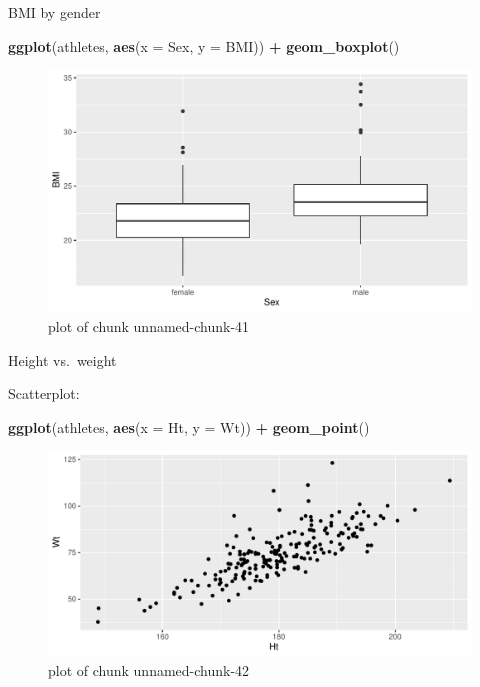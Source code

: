 \documentclass[
  ignorenonframetext,
]{beamer}
\newenvironment{Shaded}{\begin{snugshade}}{\end{snugshade}}
\newcommand{\DataTypeTok}[1]{\textcolor[rgb]{0.13,0.29,0.53}{#1}}
\newcommand{\KeywordTok}[1]{\textcolor[rgb]{0.13,0.29,0.53}{\textbf{#1}}}
\newcommand{\NormalTok}[1]{#1}
\newcommand{\OperatorTok}[1]{\textcolor[rgb]{0.81,0.36,0.00}{\textbf{#1}}}
\newcommand{\StringTok}[1]{\textcolor[rgb]{0.31,0.60,0.02}{#1}}
\begin{document}
\begin{frame}[fragile]{BMI by gender}
\protect\hypertarget{bmi-by-gender}{}

\begin{Shaded}
\begin{Highlighting}[]
\KeywordTok{ggplot}\NormalTok{(athletes, }\KeywordTok{aes}\NormalTok{(}\DataTypeTok{x =}\NormalTok{ Sex, }\DataTypeTok{y =}\NormalTok{ BMI)) }\OperatorTok{+}\StringTok{ }\KeywordTok{geom_boxplot}\NormalTok{()}
\end{Highlighting}
\end{Shaded}

\begin{figure}
\centering
\includegraphics{figure/unnamed-chunk-41-1.pdf}
\caption{plot of chunk unnamed-chunk-41}
\end{figure}

\end{frame}

\begin{frame}[fragile]{Height vs.~weight}
\protect\hypertarget{height-vs.-weight}{}

Scatterplot:

\begin{Shaded}
\begin{Highlighting}[]
\KeywordTok{ggplot}\NormalTok{(athletes, }\KeywordTok{aes}\NormalTok{(}\DataTypeTok{x =}\NormalTok{ Ht, }\DataTypeTok{y =}\NormalTok{ Wt)) }\OperatorTok{+}\StringTok{ }\KeywordTok{geom_point}\NormalTok{()}
\end{Highlighting}
\end{Shaded}

\begin{figure}
\centering
\includegraphics{figure/unnamed-chunk-42-1.pdf}
\caption{plot of chunk unnamed-chunk-42}
\end{figure}

\end{frame}
\end{document}
